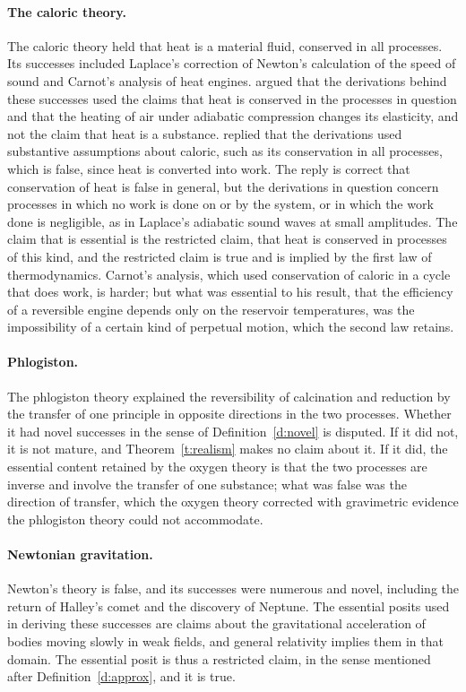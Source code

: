 \documentclass{situationist-preprint}
\begin{document}
\paragraph{The caloric theory.} The caloric theory held that heat is a material fluid, conserved in all processes. Its successes included Laplace's correction of Newton's calculation of the speed of sound and Carnot's analysis of heat engines. \citet{Psillos1999} argued that the derivations behind these successes used the claims that heat is conserved in the processes in question and that the heating of air under adiabatic compression changes its elasticity, and not the claim that heat is a substance. \citet{Chang2003} replied that the derivations used substantive assumptions about caloric, such as its conservation in all processes, which is false, since heat is converted into work. The reply is correct that conservation of heat is false in general, but the derivations in question concern processes in which no work is done on or by the system, or in which the work done is negligible, as in Laplace's adiabatic sound waves at small amplitudes. The claim that is essential is the restricted claim, that heat is conserved in processes of this kind, and the restricted claim is true and is implied by the first law of thermodynamics. Carnot's analysis, which used conservation of caloric in a cycle that does work, is harder; but what was essential to his result, that the efficiency of a reversible engine depends only on the reservoir temperatures, was the impossibility of a certain kind of perpetual motion, which the second law retains.

\paragraph{Phlogiston.} The phlogiston theory explained the reversibility of calcination and reduction by the transfer of one principle in opposite directions in the two processes. Whether it had novel successes in the sense of Definition~\ref{d:novel} is disputed. If it did not, it is not mature, and Theorem~\ref{t:realism} makes no claim about it. If it did, the essential content retained by the oxygen theory is that the two processes are inverse and involve the transfer of one substance; what was false was the direction of transfer, which the oxygen theory corrected with gravimetric evidence the phlogiston theory could not accommodate.

\paragraph{Newtonian gravitation.} Newton's theory is false, and its successes were numerous and novel, including the return of Halley's comet and the discovery of Neptune. The essential posits used in deriving these successes are claims about the gravitational acceleration of bodies moving slowly in weak fields, and general relativity implies them in that domain. The essential posit is thus a restricted claim, in the sense mentioned after Definition~\ref{d:approx}, and it is true.
\end{document}
